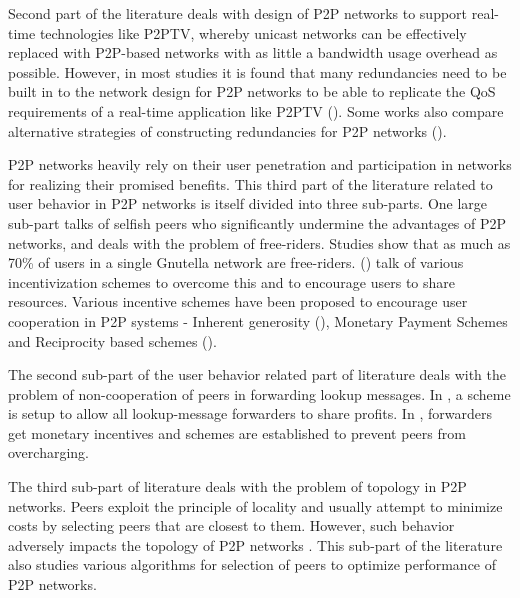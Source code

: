 \documentclass[conference,a4paper]{IEEEtran}
\begin{document}
Second part of the literature deals with design of P2P networks to support real-time technologies like P2PTV, whereby unicast networks can be effectively replaced with P2P-based networks with as little a bandwidth usage overhead as possible. However, in most studies it is found that many redundancies need to be built in to the network design for P2P networks to be able to replicate the QoS requirements of a real-time application like P2PTV (\cite{Cohen2002, Lam2004, Zhao2004}). Some works also compare alternative strategies of constructing redundancies for P2P networks (\cite{Rodrigues2005, Weatherspoon2002}).

P2P networks heavily rely on their user penetration and participation in networks for realizing their promised benefits. This third part of the literature related to user behavior in P2P networks is itself divided into three sub-parts. One large sub-part talks of selfish peers who significantly undermine the advantages of P2P networks, and deals with the problem of free-riders. Studies show that as much as 70\% of users in a single Gnutella network are free-riders. (\cite{Feldman2004, Ma2004, Wierzbicki2005, Wongrujira2005a}) talk of various incentivization schemes to overcome this and to encourage users to share resources. Various incentive schemes have been proposed to encourage user cooperation in P2P systems \cite{Feldman2005a} - Inherent generosity (\cite{Camerer2003, Feldman2004}), Monetary Payment Schemes \cite{Golle2001} and Reciprocity based schemes (\cite{Andrade2005, Cohen2003}). 

The second sub-part of the user behavior related part of literature deals with the problem of non-cooperation of peers in forwarding lookup messages. In \cite{Huang2006a}, a scheme is setup to allow all lookup-message forwarders to share profits. In \cite{Gupta2004}, forwarders get monetary incentives and schemes are established to prevent peers from overcharging.

The third sub-part of literature deals with the problem of topology in P2P networks. Peers exploit the principle of locality and usually attempt to minimize costs by selecting peers that are closest to them. However, such behavior adversely impacts the topology of P2P networks \cite{Moscibroda2006}. This sub-part of the literature also studies various algorithms for selection of peers to optimize performance of P2P networks. 
\end{document}
